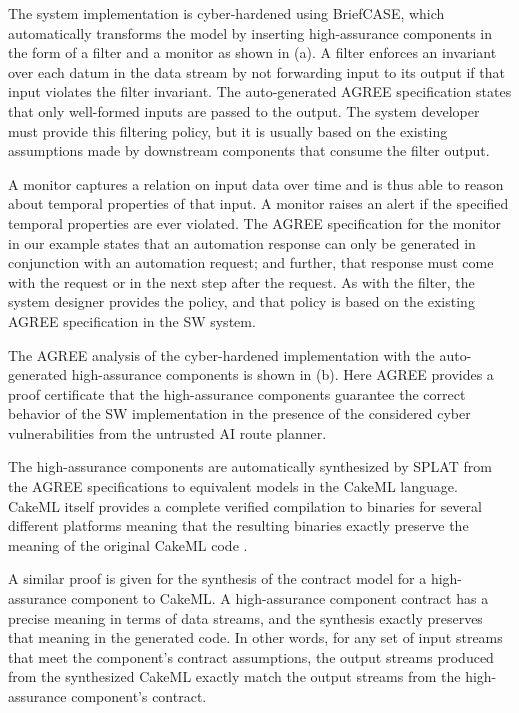 The system implementation is cyber-hardened using BriefCASE, which automatically transforms the model by inserting high-assurance components in the form of a filter and a monitor as shown in (a).
A filter enforces an invariant over each datum in the data stream by not forwarding input to its output if that input violates the filter invariant.
The auto-generated AGREE specification states that only well-formed inputs are passed to the output.
The system developer must provide this filtering policy, but it is usually based on the existing assumptions made by downstream components that consume the filter output. 

A monitor captures a relation on input data over time and is thus able to reason about temporal properties of that input.
A monitor raises an alert if the specified temporal properties are ever violated.
The AGREE specification for the monitor in our example states that an automation response can only be generated in conjunction with an automation request; and further, that response must come with the request or in the next step after the request.
As with the filter, the system designer provides the policy, and that policy is based on the existing AGREE specification in the SW system.

The AGREE analysis of the cyber-hardened implementation with the auto-generated high-assurance components is shown in (b).
Here AGREE provides a proof certificate that the high-assurance components guarantee the correct behavior of the SW implementation in the presence of the considered cyber vulnerabilities from the untrusted AI route planner.

The high-assurance components are automatically synthesized by SPLAT from the AGREE specifications to equivalent models in the CakeML language.
CakeML itself provides a complete verified compilation to binaries for several different platforms meaning that the resulting binaries exactly preserve the meaning of the original CakeML code \cite{cakeml}. 

A similar proof is given for the synthesis of the contract model for a high-assurance component to CakeML.
A high-assurance component contract has a precise meaning in terms of data streams, and the synthesis exactly preserves that meaning in the generated code.
In other words, for any set of input streams that meet the component's contract assumptions, the output streams produced from the synthesized CakeML exactly match the output streams from the high-assurance component's contract. 

